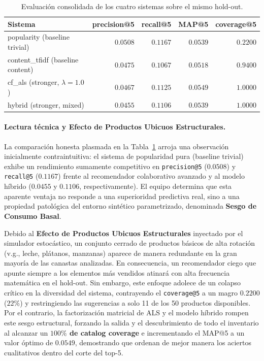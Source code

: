 \documentclass[12pt,a4paper]{article}
\newcommand{\metric}[1]{\textcolor{metricblue}{\textbf{#1}}}
\newcommand{\code}[1]{\texttt{\small #1}}
\begin{document}
\begin{table}[H]
\centering
\caption{Evaluación consolidada de los cuatro sistemas sobre el mismo hold-out.}
\label{tab:consol}
\begin{tabular}{lrrrr}
\toprule
Sistema & precision@5 & recall@5 & MAP@5 & coverage@5 \\
\midrule
popularity     (baseline trivial) & $\mathbf{0.0508}$ & $\mathbf{0.1167}$ & $0.0539$ & $0.2200$ \\
content\_tfidf (baseline content) & $0.0475$ & $0.1067$ & $0.0518$ & $0.9400$ \\
cf\_als         (stronger, $\lambda{=}1.0$) & $0.0467$ & $0.1125$ & $\mathbf{0.0549}$ & $\mathbf{1.0000}$ \\
hybrid          (stronger, mixed) & $0.0455$ & $0.1106$ & $0.0539$ & $\mathbf{1.0000}$ \\
\bottomrule
\end{tabular}
\end{table}

\paragraph{Lectura técnica y Efecto de Productos Ubicuos Estructurales.} 
La comparación honesta plasmada en la Tabla~\ref{tab:consol} arroja una observación inicialmente contraintuitiva: el sistema de popularidad pura (baseline trivial) exhibe un rendimiento sumamente competitivo en \code{precision@5} ($0.0508$) y \code{recall@5} ($0.1167$) frente al recomendador colaborativo avanzado y al modelo híbrido ($0.0455$ y $0.1106$, respectivamente). El equipo determina que esta aparente ventaja no responde a una superioridad predictiva real, sino a una propiedad patológica del entorno sintético parametrizado, denominada \textbf{Sesgo de Consumo Basal}. 

Debido al \textbf{Efecto de Productos Ubicuos Estructurales} inyectado por el simulador estocástico, un conjunto cerrado de productos básicos de alta rotación (v.g., leche, plátanos, manzanas) aparece de manera redundante en la gran mayoría de las canastas analizadas. En consecuencia, un recomendador ciego que apunte siempre a los elementos más vendidos atinará con alta frecuencia matemática en el hold-out. Sin embargo, este enfoque adolece de un colapso crítico en la diversidad del sistema, contrayendo el \code{coverage@5} a un magro $0.2200$ ($22\%$) y restringiendo las sugerencias a solo 11 de los 50 productos disponibles. Por el contrario, la factorización matricial de ALS y el modelo híbrido rompen este sesgo estructural, forzando la salida y el descubrimiento de todo el inventario al alcanzar un \metric{$100\%$ de catalog coverage} e incrementando el MAP@5 a un valor óptimo de $0.0549$, demostrando que ordenan de mejor manera los aciertos cualitativos dentro del corte del top-5.
\end{document}
